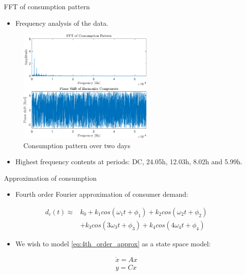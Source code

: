 	
\begin{frame}{FFT of consumption pattern}
	\begin{itemize}
		\item Frequency analysis of the data. 
	\end{itemize}
	
	 \begin{figure}[h!]
		\centering
		\includegraphics[width=0.6\textwidth]{Topics/KalmanEstimator/Graphics/FFT.pdf}
		\caption{Consumption pattern over two days}
		\label{fig:FFT_Consumption_Patter}
	\end{figure}
	
	\begin{itemize}
		\item Highest frequency contents at periods: DC, 24.05h, 12.03h, 8.02h and 5.99h. 
	\end{itemize}
\end{frame}

\begin{frame}{Approximation of consumption}
		
	\begin{itemize}
		\item Fourth order Fourier approximation of consumer demand:
	\end{itemize}
		
	\begin{equation} \label{eq:4th_order_approx}
		\begin{split}
			d_c(t) \approx& k_0 + k_1 cos(\omega_1 t + \phi_1) + k_2 cos(\omega_2 t + \phi_2)\\
			&+ k_3 cos(3\omega_3 t + \phi_3) + k_4 cos(4\omega_4 t + \phi_4)
		\end{split}
	\end{equation}

	\begin{itemize}
		\item We wish to model \ref{eq:4th_order_approx} as a state space model:
	\end{itemize}
		
		\begin{equation*}
		\begin{split}
			\dot{x}=Ax\\
			y=Cx
		\end{split}
		\end{equation*}	
\end{frame}

